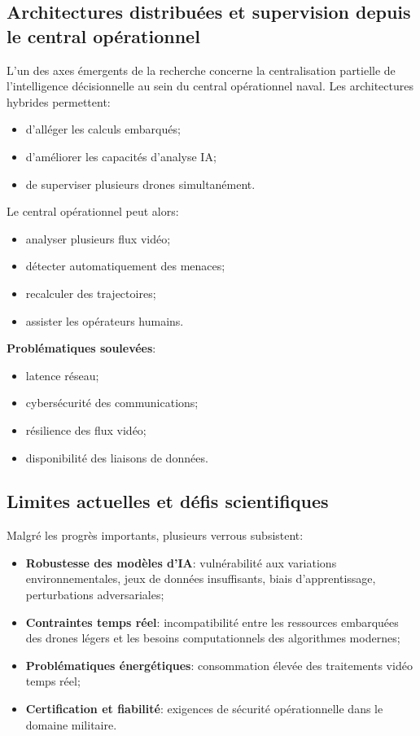 \documentclass[12pt, a4paper, twoside, openright]{report}
\begin{document}
\subsection{Architectures distribuées et supervision depuis le central opérationnel}
L’un des axes émergents de la recherche concerne la centralisation partielle de l’intelligence décisionnelle au sein du central opérationnel naval. Les architectures hybrides permettent:
\begin{itemize}
    \item d’alléger les calculs embarqués;
    \item d’améliorer les capacités d’analyse IA;
    \item de superviser plusieurs drones simultanément.
\end{itemize}

Le central opérationnel peut alors:
\begin{itemize}
    \item analyser plusieurs flux vidéo;
    \item détecter automatiquement des menaces;
    \item recalculer des trajectoires;
    \item assister les opérateurs humains.
\end{itemize}

\textbf{Problématiques soulevées}:
\begin{itemize}
    \item latence réseau;
    \item cybersécurité des communications;
    \item résilience des flux vidéo;
    \item disponibilité des liaisons de données.
\end{itemize}

\subsection{Limites actuelles et défis scientifiques}
Malgré les progrès importants, plusieurs verrous subsistent:
\begin{itemize}
    \item \textbf{Robustesse des modèles d’IA}: vulnérabilité aux variations environnementales, jeux de données insuffisants, biais d’apprentissage, perturbations adversariales;
    \item \textbf{Contraintes temps réel}: incompatibilité entre les ressources embarquées des drones légers et les besoins computationnels des algorithmes modernes;
    \item \textbf{Problématiques énergétiques}: consommation élevée des traitements vidéo temps réel;
    \item \textbf{Certification et fiabilité}: exigences de sécurité opérationnelle dans le domaine militaire.
\end{itemize}
\end{document}
